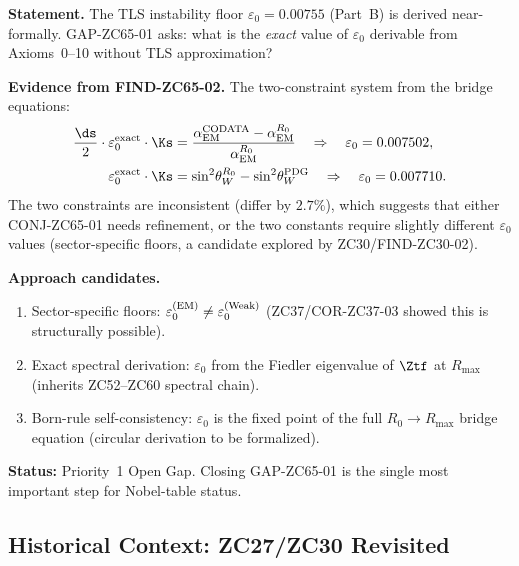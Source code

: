 \documentclass[12pt, a4paper]{article}
\renewcommand{\swsq}{\sin^2\!\theta_W}
\renewcommand{\aEM}{\alpha_{\rm EM}}
\begin{document}
\begin{openqbox}[title={GAP-ZC65-01: Exact $\varepsilon_0$
  Derivation from Axioms (Priority~1)}]
\textbf{Statement.}
The TLS instability floor $\varepsilon_0 = 0.00755$ (Part~B)
is derived near-formally.
GAP-ZC65-01 asks: what is the \emph{exact} value of
$\varepsilon_0$ derivable from Axioms~0--10 without
TLS approximation?

\textbf{Evidence from FIND-ZC65-02.}
The two-constraint system from the bridge equations:
\begin{align*}
  \frac{\ds}{2}\cdot\varepsilon_0^{\rm exact}\cdot\Ks
  &= \frac{\aEM^{\rm CODATA} - \aEM^{R_0}}{\aEM^{R_0}}
  \quad\Rightarrow\quad
  \varepsilon_0 = 0.007502, \\
  \varepsilon_0^{\rm exact}\cdot\Ks
  &= \swsq^{R_0} - \swsq^{\rm PDG}
  \quad\Rightarrow\quad
  \varepsilon_0 = 0.007710.
\end{align*}
The two constraints are inconsistent (differ by $2.7\%$),
which suggests that either CONJ-ZC65-01 needs refinement,
or the two constants require slightly different
$\varepsilon_0$ values (sector-specific floors,
a candidate explored by ZC30/FIND-ZC30-02).

\textbf{Approach candidates.}
\begin{enumerate}[leftmargin=2em, noitemsep]
  \item Sector-specific floors: $\varepsilon_0^{(\rm EM)} \neq
    \varepsilon_0^{(\rm Weak)}$ (ZC37/COR-ZC37-03 showed this
    is structurally possible).
  \item Exact spectral derivation: $\varepsilon_0$ from
    the Fiedler eigenvalue of $\Ztf$ at $R_{\max}$
    (inherits ZC52--ZC60 spectral chain).
  \item Born-rule self-consistency: $\varepsilon_0$ is
    the fixed point of the full $R_0\to R_{\max}$
    bridge equation (circular derivation to be formalized).
\end{enumerate}

\textbf{Status:} Priority~1 Open Gap.
Closing GAP-ZC65-01 is the single most important
step for Nobel-table status.
\end{openqbox}

\subsection{Historical Context: ZC27/ZC30 Revisited}
\label{sec:history}
\end{document}
